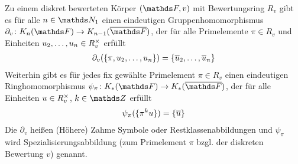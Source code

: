 \documentclass[ngerman,fontsize=11pt, paper=a4, parskip=half, titlepage=true, toc=bib]{scrartcl}
\begin{document}
\begin{Satz}\label{homomorphismen}
  Zu einem diskret bewerteten Körper $(\F,v)$ mit Bewertungsring $R_v$
  gibt es für alle $n\in\N_1$ einen eindeutigen Gruppenhomomorphismus 
  $\partial_v\colon \KnF\to \K_{n-1}(\bF)$,
  der für alle Primelemente $\pi\in R_v$ und 
  Einheiten $u_2,\dotsc, u_n\in R^\times_v$ erfüllt
  \begin{gather}\label{relationzahmessymbol}
    \partial_v(\{\pi,u_2,\dotsc,u_n\})=\{\overline u_2, \dotsc, \overline u_n\}
  \end{gather}
  Weiterhin gibt es für jedes fix gewählte Primelement $\pi\in R_v$
  einen eindeutigen Ringhomomorphismus $\psi_\pi\colon\KF\to\KbF$, 
  der für alle Einheiten $u\in R^\times_v$, $k\in\Z$ erfüllt
  \begin{gather}\label{relationspezialisierung}
    \psi_\pi(\{\pi^ku\})=\{\overline u\}
  \end{gather}
  Die $\partial_v$ heißen (Höhere) Zahme Symbole 
  oder Restklassenabbildungen und $\psi_\pi$
  wird Spezialisierungsabbildung (zum Primelement $\pi$ bzgl. der
  diskreten Bewertung $v$) genannt.
\end{Satz}
\end{document}
